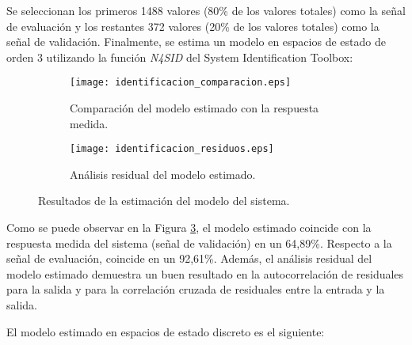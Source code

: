 Se seleccionan los primeros 1488 valores (80\% de los valores totales) como la señal de evaluación
y los restantes 372 valores (20\% de los valores totales) como la señal de validación. Finalmente,
se estima un modelo en espacios de estado de orden 3 utilizando la función \textit{N4SID} del System Identification Toolbox:

\begin{figure}[H]
    \centering

    \begin{subfigure}[b]{\textwidth}
        \centering
        \texttt{[image: identificacion\_comparacion.eps]}
        \caption{Comparación del modelo estimado con la respuesta medida.}
        \vspace{0.25cm}
        \label{fig:identificacion_comparacio n}
    \end{subfigure}
    \begin{subfigure}[b]{\textwidth}
        \centering
        \texttt{[image: identificacion\_residuos.eps]}
        \caption{Análisis residual del modelo estimado.}
        \label{fig:identificacion_residuos}
    \end{subfigure}

    \vspace{-0.25cm}
    \caption{Resultados de la estimación del modelo del sistema.}
    \label{fig:identificacion_resultados}
\end{figure}
\vspace{-0.5cm}

Como se puede observar en la Figura \ref{fig:identificacion_resultados}, el modelo estimado coincide
con la respuesta medida del sistema (señal de validación) en un 64,89\%. Respecto a la señal de 
evaluación, coincide en un 92,61\%. Además, el análisis residual del modelo estimado
demuestra un buen resultado en la autocorrelación de residuales para la salida y para la correlación
cruzada de residuales entre la entrada y la salida.

El modelo estimado en espacios de estado discreto es el siguiente:

